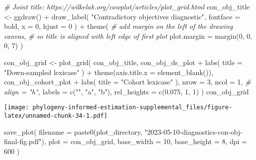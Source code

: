 \documentclass[
]{book}
\newenvironment{Shaded}{\begin{snugshade}}{\end{snugshade}}
\newcommand{\AttributeTok}[1]{\textcolor[rgb]{0.77,0.63,0.00}{#1}}
\newcommand{\CommentTok}[1]{\textcolor[rgb]{0.56,0.35,0.01}{\textit{#1}}}
\newcommand{\DecValTok}[1]{\textcolor[rgb]{0.00,0.00,0.81}{#1}}
\newcommand{\FloatTok}[1]{\textcolor[rgb]{0.00,0.00,0.81}{#1}}
\newcommand{\FunctionTok}[1]{\textcolor[rgb]{0.00,0.00,0.00}{#1}}
\newcommand{\NormalTok}[1]{#1}
\newcommand{\OtherTok}[1]{\textcolor[rgb]{0.56,0.35,0.01}{#1}}
\newcommand{\SpecialCharTok}[1]{\textcolor[rgb]{0.00,0.00,0.00}{#1}}
\newcommand{\StringTok}[1]{\textcolor[rgb]{0.31,0.60,0.02}{#1}}
\begin{document}
\begin{Shaded}
\begin{Highlighting}[]
\CommentTok{\# Joint title: https://wilkelab.org/cowplot/articles/plot\_grid.html}
\NormalTok{con\_obj\_title }\OtherTok{\textless{}{-}} \FunctionTok{ggdraw}\NormalTok{() }\SpecialCharTok{+}
  \FunctionTok{draw\_label}\NormalTok{(}
    \StringTok{"Contradictory objectives diagnostic"}\NormalTok{,}
    \AttributeTok{fontface =} \StringTok{\textquotesingle{}bold\textquotesingle{}}\NormalTok{,}
    \AttributeTok{x =} \DecValTok{0}\NormalTok{,}
    \AttributeTok{hjust =} \DecValTok{0}
\NormalTok{  ) }\SpecialCharTok{+}
  \FunctionTok{theme}\NormalTok{(}
    \CommentTok{\# add margin on the left of the drawing canvas,}
    \CommentTok{\# so title is aligned with left edge of first plot}
    \AttributeTok{plot.margin =} \FunctionTok{margin}\NormalTok{(}\DecValTok{0}\NormalTok{, }\DecValTok{0}\NormalTok{, }\DecValTok{0}\NormalTok{, }\DecValTok{7}\NormalTok{)}
\NormalTok{  )}

\NormalTok{con\_obj\_grid }\OtherTok{\textless{}{-}} \FunctionTok{plot\_grid}\NormalTok{(}
\NormalTok{  con\_obj\_title,}
\NormalTok{  con\_obj\_ds\_plot }\SpecialCharTok{+}
    \FunctionTok{labs}\NormalTok{(}
      \AttributeTok{title =} \StringTok{"Down{-}sampled lexicase"}
\NormalTok{    ) }\SpecialCharTok{+}
    \FunctionTok{theme}\NormalTok{(}\AttributeTok{axis.title.x =} \FunctionTok{element\_blank}\NormalTok{()),}
\NormalTok{  con\_obj\_cohort\_plot }\SpecialCharTok{+}
    \FunctionTok{labs}\NormalTok{(}
      \AttributeTok{title =} \StringTok{"Cohort lexicase"}
\NormalTok{    ),}
  \AttributeTok{nrow =} \DecValTok{3}\NormalTok{,}
  \AttributeTok{ncol =} \DecValTok{1}\NormalTok{,}
  \CommentTok{\# align = "h",}
  \AttributeTok{labels =} \FunctionTok{c}\NormalTok{(}\StringTok{""}\NormalTok{, }\StringTok{"a"}\NormalTok{, }\StringTok{"b"}\NormalTok{),}
  \AttributeTok{rel\_heights =} \FunctionTok{c}\NormalTok{(}\FloatTok{0.075}\NormalTok{, }\DecValTok{1}\NormalTok{, }\DecValTok{1}\NormalTok{)}
\NormalTok{)}
\NormalTok{con\_obj\_grid}
\end{Highlighting}
\end{Shaded}

\texttt{[image: phylogeny-informed-estimation-supplemental\_files/figure-latex/unnamed-chunk-34-1.pdf]}

\begin{Shaded}
\begin{Highlighting}[]
\FunctionTok{save\_plot}\NormalTok{(}
  \AttributeTok{filename =} \FunctionTok{paste0}\NormalTok{(plot\_directory, }\StringTok{"2023{-}05{-}10{-}diagnostics{-}con{-}obj{-}final{-}fig.pdf"}\NormalTok{),}
  \AttributeTok{plot =}\NormalTok{ con\_obj\_grid,}
  \AttributeTok{base\_width =} \DecValTok{10}\NormalTok{,}
  \AttributeTok{base\_height =} \DecValTok{8}\NormalTok{,}
  \AttributeTok{dpi =} \DecValTok{600}
\NormalTok{)}
\end{Highlighting}
\end{Shaded}
\end{document}
